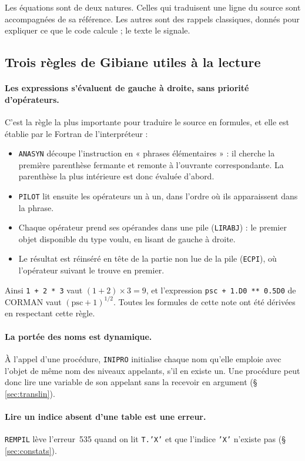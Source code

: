 \documentclass[11pt,a4paper]{article}
\numberwithin{equation}{section}
\newcommand{\pr}[1]{\textsf{#1}}                        %
\begin{document}
Les équations sont de deux natures.
Celles qui traduisent une ligne du source sont accompagnées de sa référence.
Les autres sont des rappels classiques, donnés pour expliquer ce que le code calcule ; le texte le signale.

\subsection{Trois règles de Gibiane utiles à la lecture}
\label{sec:gibiane}

\paragraph{Les expressions s'évaluent de gauche à droite, sans priorité d'opérateurs.}
C'est la règle la plus importante pour traduire le source en formules, et elle est établie par le Fortran de l'interpréteur :
\begin{itemize}
\item \texttt{ANASYN} découpe l'instruction en « phrases élémentaires » : il cherche la première parenthèse fermante et remonte à l'ouvrante correspondante. La parenthèse la plus intérieure est donc évaluée d'abord.
\item \texttt{PILOT} lit ensuite les opérateurs un à un, dans l'ordre où ils apparaissent dans la phrase.
\item Chaque opérateur prend ses opérandes dans une pile (\texttt{LIRABJ}) : le premier objet disponible du type voulu, en lisant de gauche à droite.
\item Le résultat est réinséré en tête de la partie non lue de la pile (\texttt{ECPI}), où l'opérateur suivant le trouve en premier.
\end{itemize}
Ainsi \texttt{1 + 2 * 3} vaut $(1+2)\times 3 = 9$, et l'expression \texttt{psc + 1.D0 ** 0.5D0} de \pr{CORMAN} vaut $(\mathrm{psc}+1)^{1/2}$.
Toutes les formules de cette note ont été dérivées en respectant cette règle.

\paragraph{La portée des noms est dynamique.}
À l'appel d'une procédure, \texttt{INIPRO} initialise chaque nom qu'elle emploie avec l'objet de même nom des niveaux appelants, s'il en existe un.
Une procédure peut donc lire une variable de son appelant sans la recevoir en argument (§ \ref{sec:translin}).

\paragraph{Lire un indice absent d'une table est une erreur.}
\texttt{REMPIL} lève l'erreur~535 quand on lit \texttt{T.'X'} et que l'indice \texttt{'X'} n'existe pas (§ \ref{sec:constats}).
\end{document}
